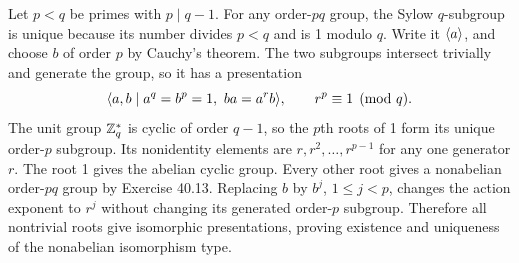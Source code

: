 Let $p<q$ be primes with $p\mid q-1$. For any order-$pq$ group, the Sylow $q$-subgroup is unique because its number divides $p<q$ and is 1 modulo $q$. Write it $\langle a\rangle$, and choose $b$ of order $p$ by Cauchy's theorem. The two subgroups intersect trivially and generate the group, so it has a presentation
\[
\langle a,b\mid a^q=b^p=1,\ ba=a^rb\rangle,\qquad r^p\equiv1\pmod q.
\]
The unit group $\mathbb{Z}_q^*$ is cyclic of order $q-1$, so the $p$th roots of 1 form its unique order-$p$ subgroup. Its nonidentity elements are $r,r^2,\ldots,r^{p-1}$ for any one generator $r$.
The root 1 gives the abelian cyclic group. Every other root gives a nonabelian order-$pq$ group by Exercise 40.13. Replacing $b$ by $b^j$, $1\le j<p$, changes the action exponent to $r^j$ without changing its generated order-$p$ subgroup. Therefore all nontrivial roots give isomorphic presentations, proving existence and uniqueness of the nonabelian isomorphism type.
